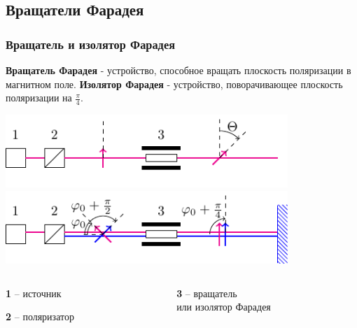 \documentclass[10pt,pdf,hyperref={unicode}, dvipsnames]{beamer}
\begin{document}
\begin{frame}[t]
	\subsection{Вращатели Фарадея}
	\frametitle{Вращатель и изолятор Фарадея}
	\textbf{Вращатель Фарадея} - устройство, способное вращать плоскость поляризации в магнитном поле. \textbf{Изолятор Фарадея} - устройство, поворачивающее плоскость поляризации на $\frac{\pi}{4}$. 
	\begin{center}
		\includegraphics[width=0.8\textwidth]{images/rot}\\
		\includegraphics[width=0.8\textwidth]{images/zerc}
	\end{center}
	\begin{columns}
		\hspace{2.5cm}
		\begin{column}{0.3\textwidth}
			
			\textbf{1} -- источник
			
			\textbf{2} -- поляризатор
			
		\end{column}
		\hspace{1.6cm}
		\begin{column}{0.7\textwidth}
			
			\textbf{3} -- вращатель\\
			или изолятор Фарадея
		\end{column}
	\end{columns}
\end{frame}

\end{document}
